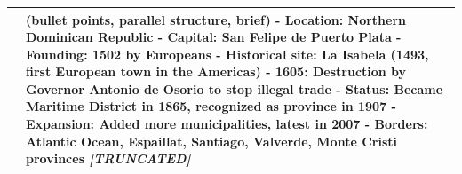 \begin{table}[h!]
\begin{tabular}{p{} p{}}
    & \textbf{(bullet points, parallel structure, brief)} \newline
- Location: Northern Dominican Republic \newline
- Capital: San Felipe de Puerto Plata \newline
- Founding: 1502 by Europeans\newline
- Historical site: La Isabela (1493, first European town in the Americas)\newline
- 1605: Destruction by Governor Antonio de Osorio to stop illegal trade\newline
- Status: Became Maritime District in 1865, recognized as province in 1907\newline
- Expansion: Added more municipalities, latest in 2007\newline
- Borders: Atlantic Ocean, Espaillat, Santiago, Valverde, Monte Cristi provinces\newline
\textit{[TRUNCATED]} \\
\midrule
\end{tabular}
    \label{tab:user_edits}
\end{table}
